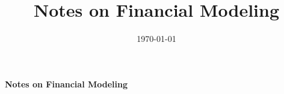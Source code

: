 \documentclass[a4paper]{article}
\title{Notes on Financial Modeling}
\date{\today}
\begin{document}
	
\begin{center}
	\Large{\bf Notes on Financial Modeling}\\
\end{center}	

 
%
%  
%




\appendix



%
\end{document}
